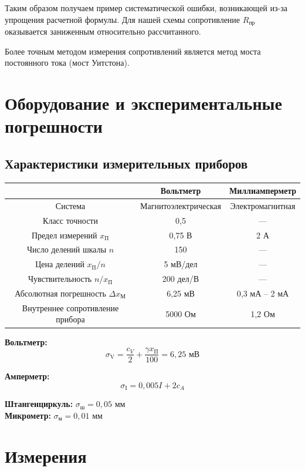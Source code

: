 \documentclass[a4paper, 12pt]{article}
\begin{document}
Таким образом получаем пример систематической ошибки, возникающей из-за упрощения расчетной формулы. Для нашей схемы сопротивление $R_\text{пр}$ оказывается заниженным относительно рассчитанного.

Более точным методом измерения сопротивлений является метод моста постоянного тока (мост Уитстона).

\section{Оборудование и экспериментальные погрешности}

\subsection{Характеристики измерительных приборов}
\begin{longtable}[H]{|c|c|c|}
	\hline
	& Вольтметр & Миллиамперметр\\
	\hline
	Система & Магнитоэлектрическая & Электромагнитная \\
	Класс точности & 0,5 & --- \\
	Предел измерений $x_\text{П}$ & 0,75 В & 2 А\\
	Число делений шкалы $n$ & 150 & ---\\
	Цена делений $x_\text{П}/n$ & 5 мВ/дел & ---\\
	Чувствительность $n/x_\text{П}$ & 200 дел/В & --- \\
	Абсолютная погрешность $\Delta x_\text{М}$ & 6,25 мВ & 0,3 мА -- 2 мА\\
	Внутреннее сопротивление прибора & 5000 Ом & 1,2 Ом \\
	\hline
\end{longtable}
\textbf{Вольтметр:}
\begin{equation}
	 \sigma_\text{V} = \frac{c_V}{2} + \frac{\gamma x_\text{П}}{100} = 6,25\text{ мВ}
\end{equation}

\textbf{Амперметр:} 
\begin{equation}
	 \sigma_\text{I} = 0,005I + 2c_A
\end{equation}

\textbf{Штангенциркуль:} $ \sigma_\text{ш} = 0,05 \text{ мм}$\\

\textbf{Микрометр:} $ \sigma_\text{м} = 0,01 \text{ мм}$
\section{Измерения}
\end{document}
